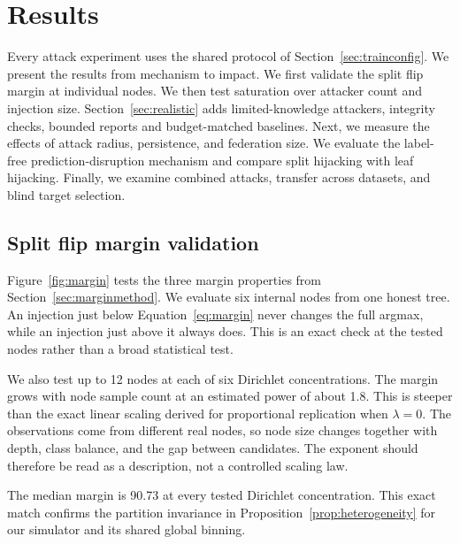 \documentclass[11pt]{article}
\newcommand{\rev}[1]{{\color{blue}#1}}
\begin{document}
\FloatBarrier

\section{Results}
\label{sec:experiments}

\rev{Every attack experiment uses the shared protocol of Section~\ref{sec:trainconfig}.} We present the results from mechanism to impact. We first validate the split flip margin at individual nodes. We then test saturation over attacker count and injection size. \rev{Section~\ref{sec:realistic} adds limited-knowledge attackers, integrity checks, bounded reports and budget-matched baselines.} Next, we measure the effects of attack radius, persistence, and federation size. We evaluate the label-free \rev{prediction-disruption mechanism} and compare split hijacking with leaf hijacking. Finally, we examine combined attacks, transfer across datasets, and blind target selection.

\subsection{Split flip margin validation}
\label{sec:marginresults}

Figure~\ref{fig:margin} tests the three margin properties from Section~\ref{sec:marginmethod}. We evaluate six internal nodes from one honest tree. An injection just below Equation~\ref{eq:margin} never changes the full argmax, while an injection just above it always does. This is an exact check at the tested nodes rather than a broad statistical test.

We also test up to 12 nodes at each of six Dirichlet concentrations. The margin grows with node sample count at an estimated power of about 1.8. This is steeper than the exact linear scaling derived for proportional replication when $\lambda=0$. The observations come from different real nodes, so node size changes together with depth, class balance, and the gap between candidates. The exponent should therefore be read as a description, not a controlled scaling law.

The median margin is 90.73 at every tested Dirichlet concentration. This exact match confirms the partition invariance in Proposition~\ref{prop:heterogeneity} for our simulator and its shared global binning.
\end{document}
